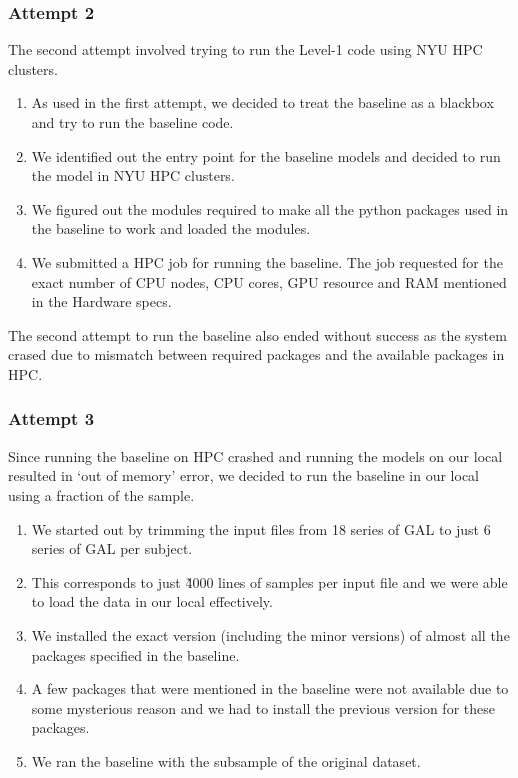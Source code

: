 \documentclass[final,leqno,onefignum,onetabnum]{siamltexmm}
\begin{document}
\subsubsection{Attempt 2}
The second attempt\cite{website:attempt_2} involved trying to run the Level-1 code using NYU HPC clusters.
\begin{enumerate}
  \item As used in the first attempt, we decided to treat the baseline as a blackbox and try to run the baseline code.
  \item We identified out the entry point for the baseline models and decided to run the model in NYU HPC clusters.
  \item We figured out the modules required to make all the python packages used in the baseline to work and loaded the modules.
  \item We submitted a HPC job for running the baseline.  The job requested for the exact number of CPU nodes, CPU cores, GPU resource and RAM mentioned in the Hardware specs. 
\end{enumerate}

The second attempt to run the baseline also ended without success as the system crased due to mismatch between required packages and the available packages in HPC\@.

\subsubsection{Attempt 3}
Since running the baseline on HPC crashed and running the models on our local resulted in `out of memory' error, we decided to run the baseline in our local using a fraction of the sample.

\begin{enumerate}
  \item We started out by trimming the input files from 18 series of GAL to just 6 series of GAL per subject.
  \item This corresponds to just \~4000 lines of samples per input file and we were able to load the data in our local effectively.
  \item We installed the exact version (including the minor versions) of almost all the packages specified in the baseline.
  \item A few packages that were mentioned in the baseline were not available due to some mysterious reason and we had to install the previous version for these packages.
  \item We ran the baseline with the subsample of the original dataset.
\end{enumerate}
\end{document}
